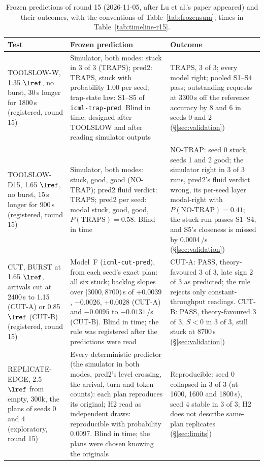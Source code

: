 \begin{table}[!tp]
\centering\footnotesize
\caption{Frozen predictions of round 15 (2026-11-05, after Lu et al.'s paper appeared) and their outcomes, with the conventions of Table~\ref{tab:frozensum}; times in Table~\ref{tab:timeline-r15}.}\label{tab:frozensum15}
\setlength{\tabcolsep}{3pt}
\begin{tabular}{@{}>{\raggedright\arraybackslash}p{3.0cm} >{\raggedright\arraybackslash}p{7.4cm} >{\raggedright\arraybackslash}p{6.5cm}@{}}
\toprule
Test & Frozen prediction & Outcome\\
\midrule
TOOLSLOW-W, 1.35 $\lref$, no burst, 30\,s longer for 1800\,s (registered, round 15) & Simulator, both modes: stuck in 3 of 3 (TRAPS); pred2: TRAPS, stuck with probability 1.00 per seed; trap-state law: S1--S5 of \texttt{icml-trap-pred}. Blind in time; designed after TOOLSLOW and after reading simulator outputs & TRAPS, 3 of 3; every model right; pooled S1--S4 pass; outstanding requests at 3300\,s off the reference accuracy by 8 and 6 in seeds 0 and 2 (\S\ref{sec:validation})\\
\addlinespace[0.3pt]
TOOLSLOW-D15, 1.65 $\lref$, no burst, 15\,s longer for 900\,s (registered, round 15) & Simulator, both modes: stuck, good, good (NO-TRAP); pred2 fluid verdict: TRAPS; pred2 per seed: modal stuck, good, good, $P(\text{TRAPS})=0.58$. Blind in time & NO-TRAP: seed 0 stuck, seeds 1 and 2 good; the simulator right in 3 of 3 runs, pred2's fluid verdict wrong, its per-seed layer modal-right with $P(\text{NO-TRAP})=0.41$; the stuck run passes S1--S4, and S5's closeness is missed by 0.0004\,/s (\S\ref{sec:validation})\\
\addlinespace[0.3pt]
CUT, BURST at 1.65 $\lref$, arrivals cut at 2400\,s to 1.15 (CUT-A) or 0.85 $\lref$ (CUT-B) (registered, round 15) & Model~F (\texttt{icml-cut-pred}), from each seed's exact plan: all six stuck; backlog slopes over $[3000,8700)$\,s of $+0.0039$, $-0.0026$, $+0.0028$ (CUT-A) and $-0.0095$ to $-0.0131$\,/s (CUT-B). Blind in time; the rule was registered after the predictions were read & CUT-A: PASS, theory-favoured 3 of 3, late sign 2 of 3 as predicted; the rule rejects only constant-throughput readings. CUT-B: PASS, theory-favoured 3 of 3, $S<0$ in 3 of 3, still stuck at 8700\,s (\S\ref{sec:validation})\\
\addlinespace[0.3pt]
REPLICATE-EDGE, 2.5 $\lref$ from empty, 300k, the plans of seeds 0 and 4 (exploratory, round 15) & Every deterministic predictor (the simulator in both modes, pred2's level crossing, the arrival, turn and token counts): each plan reproduces its original; H2 read as independent draws: reproducible with probability 0.0097. Blind in time; the plans were chosen knowing the originals & Reproducible: seed 0 collapsed in 3 of 3 (at 1600, 1600 and 1800\,s), seed 4 stable in 3 of 3; H2 does not describe same-plan replicates (\S\ref{sec:limits})\\
\bottomrule
\end{tabular}
\end{table}

